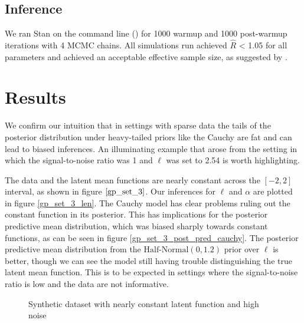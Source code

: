 \documentclass{article}
\begin{document}
\subsection{Inference}

We ran Stan on the command line (\citet{cmdstan}) for 1000 warmup and 1000
post-warmup iterations with 4 MCMC chains. All simulations run achieved
$\hat{R}$ < 1.05 for all parameters and achieved an acceptable effective sample
size, as suggested by \citet{gelman2014bayesian}.

\section{Results} \label{results}

We confirm our intuition that in settings with sparse data the tails of the
posterior distribution under heavy-tailed priors like the Cauchy are fat and
can lead to biased inferences. An illuminating example that arose from the
setting in which the signal-to-noise ratio was 1 and $\ell$ was set to 2.54 is
worth highlighting.

The data and the latent mean functions are nearly constant across the $[-2,2]$
interval, as shown in figure $\ref{gp_set_3}$. Our inferences for $\ell$ and $\alpha$
are plotted in figure \ref{gp_set_3_len}. The Cauchy model has clear problems ruling
out the constant function in its posterior. This has implications for the 
posterior predictive mean distribution, which was biased sharply towards
constant functions, as can be seen in figure \ref{gp_set_3_post_pred_cauchy}. The
posterior predictive mean distribution from the $\text{Half-Normal}(0, 1.2)$
prior over $\ell$ is better, though we can see the model still having trouble
distinguishing the true latent mean function. This is to be expected in settings
where the signal-to-noise ratio is low and the data are not informative.

\begin{figure}[h]
  \centering
  \caption{Synthetic dataset with nearly constant latent function and high noise} \label{gp_set_3}
\end{figure}
\end{document}
